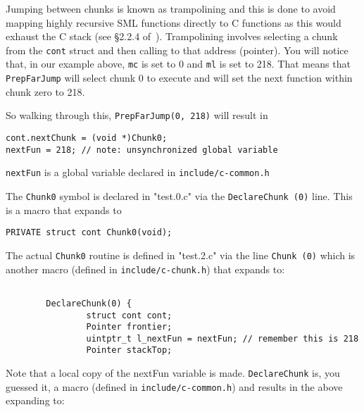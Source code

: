 Jumping between chunks is known as trampolining and this is done to avoid mapping highly recursive SML functions directly to C functions as this would exhaust the C stack (see \S2.2.4 of~\cite{leibig:mlton-llvm-backend}). Trampolining involves selecting a chunk from the \texttt{cont} struct and then calling to that address (pointer). You will notice that, in our example above, \texttt{mc} is set to 0 and \texttt{ml} is set to 218. That means that \texttt{PrepFarJump} will select chunk 0 to execute and will set the next function within chunk zero to 218. 

So walking through this, \texttt{PrepFarJump(0, 218)} will result in 

\begin{minipage}{\linewidth}
\lstset{language=C}\begin{lstlisting}
cont.nextChunk = (void *)Chunk0;
nextFun = 218; // note: unsynchronized global variable
\end{lstlisting}
\end{minipage}

\texttt{nextFun} is a global variable declared in \texttt{include/c-common.h}

The \texttt{Chunk0} symbol is declared in "test.0.c" via the \texttt{DeclareChunk (0)} line. This is a macro that expands to 

\begin{minipage}{\linewidth}
\lstset{language=C}\begin{lstlisting}
PRIVATE struct cont Chunk0(void);
\end{lstlisting}
\end{minipage}

The actual \texttt{Chunk0} routine is defined in "test.2.c" via the line \texttt{Chunk (0)} which is another macro (defined in \texttt{include/c-chunk.h}) that expands to:

\begin{minipage}{\linewidth}
\lstset{language=C}\begin{lstlisting}
	
        DeclareChunk(0) {
                struct cont cont;
                Pointer frontier;
                uintptr_t l_nextFun = nextFun; // remember this is 218
                Pointer stackTop;
\end{lstlisting}
\end{minipage}

Note that a local copy of the nextFun variable is made. \texttt{DeclareChunk} is, you guessed it, a macro (defined in \texttt{include/c-common.h}) and results in the above expanding to:


